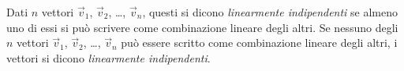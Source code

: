 \ovalbox{\risolvi \ref{ese:B.8}}

\begin{definizione}
Dati $n$ vettori $\vec{v}_1$, $\vec{v}_2$, \ldots, $\vec{v}_n$, questi si dicono \emph{linearmente indipendenti} se almeno uno di essi si può scrivere come combinazione lineare degli altri. Se nessuno degli $n$ vettori $\vec{v}_1$, $\vec{v}_2$, \ldots, $\vec{v}_n$ può essere scritto come combinazione lineare degli altri, i vettori si dicono \emph{linearmente indipendenti}.
\end{definizione}

\vspazio\ovalbox{\risolvii \ref{ese:B.9}, \ref{ese:B.10}}

\newpage

\cleardoublepage
